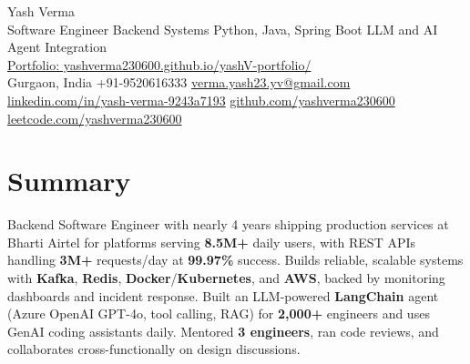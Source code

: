 \documentclass[letterpaper,11pt]{article}
\begin{document}
\begin{center}
  {\Huge Yash Verma} \\
  \small Software Engineer \textbar{} Backend Systems \textbar{} Python, Java, Spring Boot \textbar{} LLM and AI Agent Integration \\
  \href{https://yashverma230600.github.io/yashV-portfolio/}{Portfolio: yashverma230600.github.io/yashV-portfolio/} \\
  \vspace{8pt}
  \small
  Gurgaon, India \textbar{}
  +91-9520616333 \textbar{}
  \href{mailto:verma.yash23.yv@gmail.com}{verma.yash23.yv@gmail.com} \textbar{}
  \href{https://www.linkedin.com/in/yash-verma-9243a7193/}{linkedin.com/in/yash-verma-9243a7193} \textbar{}
  \href{https://github.com/yashverma230600}{github.com/yashverma230600} \textbar{}
  \href{https://leetcode.com/yashverma230600}{leetcode.com/yashverma230600}
  \vspace{-8pt}
\end{center}

\section{Summary}
\begin{itemize}[leftmargin=0.15in, label={}]
  \small{\item{
    Backend Software Engineer with nearly 4 years shipping production services at Bharti Airtel for platforms serving \textbf{8.5M+} daily users, with REST APIs handling \textbf{3M+} requests/day at \textbf{99.97\%} success. Builds reliable, scalable systems with \textbf{Kafka}, \textbf{Redis}, \textbf{Docker}/\textbf{Kubernetes}, and \textbf{AWS}, backed by monitoring dashboards and incident response. Built an LLM-powered \textbf{LangChain} agent (Azure OpenAI GPT-4o, tool calling, RAG) for \textbf{2,000+} engineers and uses GenAI coding assistants daily. Mentored \textbf{3 engineers}, ran code reviews, and collaborates cross-functionally on design discussions.
  }}
\end{itemize}
\vspace{-8pt}

\end{document}
